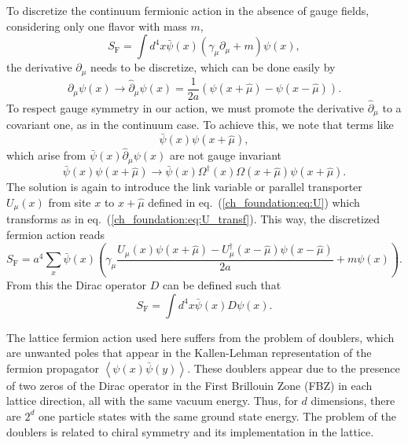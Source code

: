 To discretize the continuum fermionic action in the absence of gauge fields, considering only one flavor with mass $m$,
\begin{equation}
S_{\textrm{F}}=\int d^4x\bar{\psi}(x)\left(\gamma_{\mu}\partial_{\mu}+m\right)\psi(x),
\end{equation}
the derivative $\partial_{\mu}$ needs to be discretize, which can be done easily by
\begin{equation}
\partial_{\mu}\psi(x)\rightarrow\hat{\partial}_{\mu}\psi(x)=\frac{1}{2a}\left(\psi(x+\hat{\mu})-\psi(x-\hat{\mu})\right).
\end{equation}
To respect gauge symmetry in our action, we must promote the derivative $\hat{\partial}_{\mu}$ to a covariant one, as in the continuum case. To achieve this, we note that terms like
\begin{equation}
\bar{\psi}(x)\psi(x+\hat{\mu}),
\end{equation}
which arise from $\bar{\psi}(x)\hat{\partial}_{\mu}\psi(x)$ are not gauge invariant
\begin{equation}
\bar{\psi}(x)\psi(x+\hat{\mu})\to\bar{\psi}(x)\Omega^{\dagger}(x)\Omega(x+\hat{\mu})\psi(x+\hat{\mu}).
\end{equation}
The solution is again to introduce the link variable or parallel transporter $U_{\mu}(x)$ from site $x$ to $x+\hat{\mu}$ defined in eq.~(\ref{ch_foundation:eq:U}) which transforms as in eq.~(\ref{ch_foundation:eq:U_transf}). This way, the discretized fermion action reads
\begin{equation}
\label{ch_foundation:eq:naive}
S_{\textrm{F}}=a^4\sum_x\bar{\psi}(x)\left(\gamma_{\mu}\frac{U_{\mu}(x)\psi(x+\hat{\mu})-U_{\mu}^{\dagger}(x-\hat{\mu})\psi(x-\hat{\mu})}{2a}+m\psi(x)\right).
\end{equation}
From this the Dirac operator $D$ can be defined such that
\begin{equation}
S_{\textrm{F}}=\int d^4x\bar{\psi}(x)D\psi(x).
\end{equation}

The lattice fermion action used here suffers from the problem of doublers, which are unwanted poles that appear in the Kallen-Lehman representation of the fermion propagator $\left<\psi(x)\bar{\psi}(y)\right>$. These doublers appear due to the presence of two zeros of the Dirac operator in the First Brillouin Zone (FBZ) in each lattice direction, all with the same vacuum energy.  Thus, for $d$ dimensions, there are $2^d$ one particle states with the same ground state energy. The problem of the doublers is related to chiral symmetry and its implementation in the lattice.

